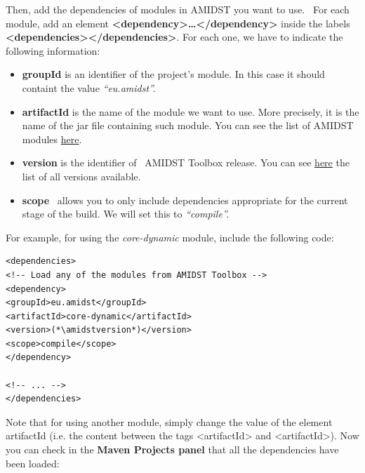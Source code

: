 \documentclass[10pt,a4paper]{article}
\begin{document}
Then, add the dependencies of modules in AMIDST you want to use.~
For each module, add an element \textbf{\textless{}dependency\textgreater{}\textbf{\ldots{}\textless{}/dependency\textgreater{}}}
inside the labels
\textbf{\textless{}dependencies\textgreater{}\textless{}/dependencies\textgreater{}}. For each one, we have to indicate the following
information:\newline

\begin{itemize}
	\item
	\textbf{groupId} is an identifier of the project's module. In this case it
	should containt the value \emph{``eu.amidst''.}
	\item
	\textbf{artifactId }is the name of the module we want to use. More precisely,
	it is the name of the jar file containing such module. You can see the
	list of AMIDST modules
	\href{https://github.com/amidst/toolbox/tree/mvn-repo/eu/amidst}{here}.
	\item
	\textbf{version} is the identifier of~ AMIDST Toolbox release. You can
	see
	\href{mohttps://github.com/amidst/toolbox/blob/master/CHANGELOG.mddules\%20here}{here}
	the list of all versions available.
	\item
	\textbf{scope}~ allows you to only include dependencies appropriate
	for the current stage of the build. We will set this to
	\emph{``compile''.}
\end{itemize}


\vspace{2mm}
\noindent For example, for using the \textit{core-dynamic }module, include the
following code:

\begin{lstlisting}
<dependencies>
<!-- Load any of the modules from AMIDST Toolbox -->
<dependency>
<groupId>eu.amidst</groupId>
<artifactId>core-dynamic</artifactId>
<version>(*\amidstversion*)</version>
<scope>compile</scope>
</dependency>

<!-- ... -->
</dependencies>        
\end{lstlisting}

Note that for using another module,  simply change the value of the
element artifactId (i.e. the content between the tags
\textless{}artifactId\textgreater{} and
\textless{}artifactId\textgreater{}). Now you can check in the \textbf{Maven Projects panel }that all the
dependencies have been loaded:\newline 
\end{document}
